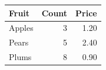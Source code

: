 \documentclass[border=6pt,preview]{standalone}
\begin{document}
\begin{tabular}{|l|r|r|}
\hline
Fruit & Count & Price \\
\hline
Apples & 3 & 1.20 \\
\hline
Pears & 5 & 2.40 \\
\hline
Plums & 8 & 0.90 \\
\hline
\end{tabular}
\end{document}
